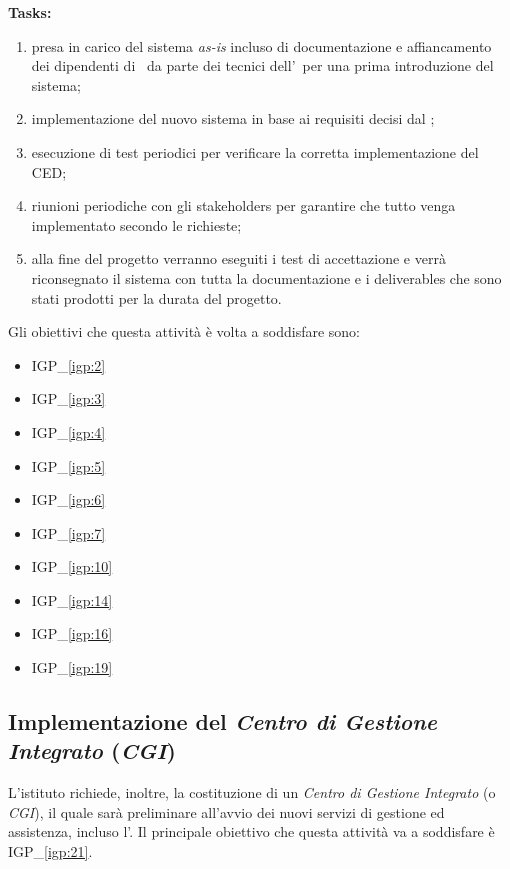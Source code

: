 		\textbf{Tasks:}
		\begin{enumerate}[noitemsep]
			\item presa in carico del sistema \textit{as-is} incluso di documentazione e affiancamento dei dipendenti di \azienda~da parte dei tecnici dell'\istituto~per una prima introduzione del sistema;
			\item implementazione del nuovo sistema in base ai requisiti decisi dal \proponente;
			\item esecuzione di test periodici per verificare la corretta implementazione del CED;
			\item riunioni periodiche con gli stakeholders per garantire che tutto venga implementato secondo le richieste;
			\item alla fine del progetto verranno eseguiti i test di accettazione e verrà riconsegnato il sistema con tutta la documentazione e i deliverables che sono stati prodotti per la durata del progetto.
		\end{enumerate}

		Gli obiettivi che questa attività è volta a soddisfare sono:
		\begin{itemize}[noitemsep]
			\renewcommand\labelitemi{--}
			\item {\color{pantone}IGP\_\ref{igp:2}}
			\item {\color{pantone}IGP\_\ref{igp:3}}
			\item {\color{pantone}IGP\_\ref{igp:4}}
			\item {\color{pantone}IGP\_\ref{igp:5}}
			\item {\color{pantone}IGP\_\ref{igp:6}}
			\item {\color{pantone}IGP\_\ref{igp:7}}
			\item {\color{pantone}IGP\_\ref{igp:10}}
			\item {\color{pantone}IGP\_\ref{igp:14}}
			\item {\color{pantone}IGP\_\ref{igp:16}}
			\item {\color{pantone}IGP\_\ref{igp:19}}
		\end{itemize}

	\newpage
	\subsection{Implementazione del \textit{Centro di Gestione Integrato} (\textit{CGI})}
	
		L'istituto richiede, inoltre, la costituzione di un \textit{Centro di Gestione Integrato} (o \textit{CGI}), il quale sarà preliminare all'avvio dei nuovi servizi di gestione ed assistenza, incluso l'\helpdesk.
		Il principale obiettivo che questa attività va a soddisfare è {\color{pantone}IGP\_\ref{igp:21}}.
		
